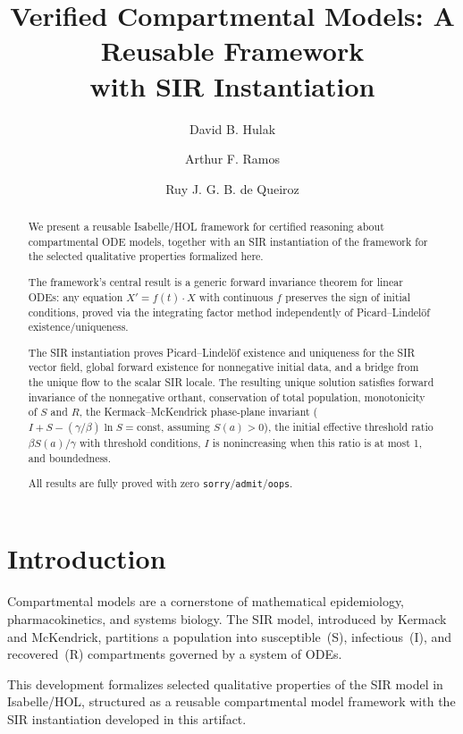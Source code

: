 \documentclass[11pt,a4paper]{article}
\begin{document}
\title{Verified Compartmental Models: A Reusable Framework\\with SIR Instantiation}
\author{David B. Hulak \and Arthur F. Ramos \and Ruy J. G. B. de Queiroz}
\maketitle

\begin{abstract}
We present a reusable Isabelle/HOL framework for certified reasoning about
compartmental ODE models, together with an SIR instantiation of the framework
for the selected qualitative properties formalized here.

The framework's central result is a generic forward invariance theorem for
linear ODEs: any equation $X' = f(t) \cdot X$ with continuous $f$ preserves
the sign of initial conditions, proved via the integrating factor method
independently of Picard--Lindel\"of existence/uniqueness.

The SIR instantiation proves Picard--Lindel\"of existence and uniqueness for
the SIR vector field, global forward existence for nonnegative initial data,
and a bridge from the unique flow to the scalar SIR locale.  The resulting
unique solution satisfies forward invariance of the nonnegative orthant,
conservation of total population, monotonicity of $S$ and $R$, the
Kermack--McKendrick phase-plane invariant
($I + S - (\gamma/\beta)\ln S = \text{const}$, assuming $S(a)>0$), the
initial effective threshold ratio $\beta S(a)/\gamma$ with threshold
conditions, $I$ is nonincreasing when this ratio is at most 1, and
boundedness.

All results are fully proved with zero \texttt{sorry}/\texttt{admit}/\texttt{oops}.
\end{abstract}

\tableofcontents

\section{Introduction}

Compartmental models are a cornerstone of mathematical epidemiology,
pharmacokinetics, and systems biology. The SIR model, introduced by
Kermack and McKendrick\nobreakspace{}\cite{kermack1927}, partitions a population into susceptible~(S),
infectious~(I), and recovered~(R) compartments governed by a system of ODEs.

This development formalizes selected qualitative properties of the SIR model
in Isabelle/HOL, structured as a reusable compartmental model framework
with the SIR instantiation developed in this artifact.
\end{document}
